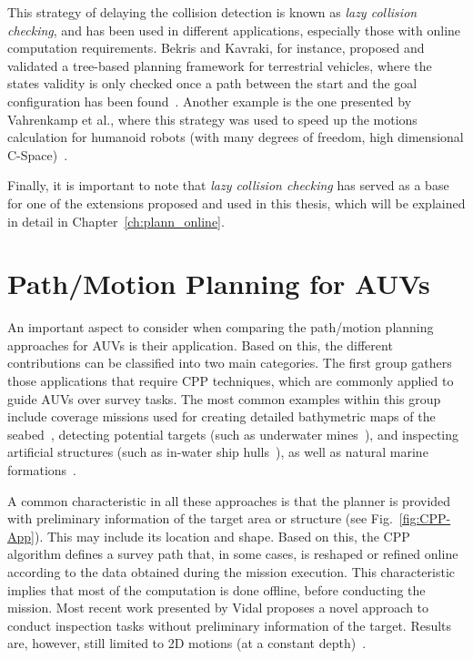 This strategy of delaying the collision detection is known as \textit{lazy
collision checking}, and has been used in different applications, especially
those with online computation requirements. Bekris and Kavraki, for instance,
proposed and validated a tree-based planning framework for terrestrial vehicles,
where the states validity is only checked once a path between the start and the
goal configuration has been found~\cite{Bekris2007}. Another example is the one
presented by Vahrenkamp et al., where this strategy was used to speed up the
motions calculation for humanoid robots (with many degrees of freedom, \ie high
dimensional \ac{C-Space})~\cite{Vahrenkamp2007}.

Finally, it is important to note that \textit{lazy collision checking} has
served as a base for one of the extensions proposed and used in this thesis,
which will be explained in detail in Chapter~\ref{ch:plann_online}.

\section{Path/Motion Planning for AUVs}
\label{sec:StateOfTheArtPlannAUV}

An important aspect to consider when comparing the path/motion planning
approaches for \acp{AUV} is their application. Based on this, the different
contributions can be classified into two main categories. The first group
gathers those applications that require \acf{CPP} techniques, which are commonly
applied to guide \acp{AUV} over survey tasks. The most common examples within
this group include coverage missions used for creating detailed bathymetric
maps of the seabed~\cite{Fang2010, Galceran2012, Galceran2013b, Galceran2013d},
detecting potential targets (such as underwater mines~\cite{Stack2003,
Williams2010}), and inspecting artificial structures (such as in-water ship
hulls~\cite{Englot2010, Hover2012, Hollinger2013, Englot2013}), as well as
natural marine formations~\cite{Galceran2014,Galceran2014b}.

A common characteristic in all these approaches is that the planner is provided
with preliminary information of the target area or structure (see
Fig.~\ref{fig:CPP-App}). This may include its location and shape. Based on this,
the \ac{CPP} algorithm defines a survey path that, in some cases, is reshaped or
refined online according to the data obtained during the mission execution. This
characteristic implies that most of the computation is done offline, \ie before
conducting the mission. Most recent work presented by Vidal \etal proposes a
novel approach to conduct inspection tasks without preliminary information of
the target. Results are, however, still limited to \ac{2D} motions (at a
constant depth)~\cite{Vidal2017}.

